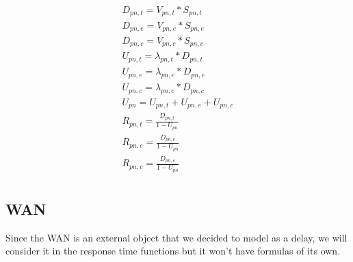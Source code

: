 \documentclass[11pt]{article}
\begin{document}
\begin{equation}
    \begin{array}{l}
        D_{pn, t} = V_{pn, t} * S_{pn, t} \\
        D_{pn, e} = V_{pn, e} * S_{pn, e} \\
        D_{pn, c} = V_{pn, c} * S_{pn, c} \\
        U_{pn, t} = \lambda_{pn, t} * D_{pn, t} \\
        U_{pn, e} = \lambda_{pn, e} * D_{pn, e} \\
        U_{pn, c} = \lambda_{pn, c} * D_{pn, c} \\
        U_{pn} = U_{pn, t} + U_{pn, e} + U_{pn, c} \\
        R_{pn, t} = \frac{D_{pn, t}}{1 - U_{pn}} \\
        R_{pn, e} = \frac{D_{pn, e}}{1 - U_{pn}} \\
        R_{pn, c} = \frac{D_{pn, c}}{1 - U_{pn}} \\
    \end{array}
\end{equation}
\subsection{WAN}
Since the WAN is an external object that we decided to model as a delay, we will consider it in the response time functions but it won't have formulas of its own.
\end{document}
